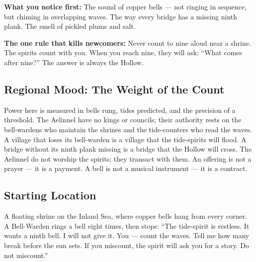 \vspace{1em}

\begin{tcolorbox}[colback=black!3,colframe=blue!60!black,title={Theme \& Atmosphere},breakable]
\textbf{What you notice first:} The sound of copper bells --- not ringing in sequence, but chiming in overlapping waves. The way every bridge has a missing ninth plank. The smell of pickled plums and salt.

\textbf{The one rule that kills newcomers:} Never count to nine aloud near a shrine. The spirits count with you. When you reach nine, they will ask: ``What comes after nine?'' The answer is always the Hollow.
\end{tcolorbox}

\subsection*{Regional Mood: The Weight of the Count}

Power here is measured in bells rung, tides predicted, and the precision of a threshold. The Aelinnel have no kings or councils; their authority rests on the bell-wardens who maintain the shrines and the tide-counters who read the waves. A village that loses its bell-warden is a village that the tide-spirits will flood. A bridge without its ninth plank missing is a bridge that the Hollow will cross. The Aelinnel do not worship the spirits; they transact with them. An offering is not a prayer --- it is a payment. A bell is not a musical instrument --- it is a contract.

\subsection*{Starting Location}

A floating shrine on the Inland Sea, where copper bells hang from every corner. A Bell-Warden rings a bell eight times, then stops: ``The tide-spirit is restless. It wants a ninth bell. I will not give it. You --- count the waves. Tell me how many break before the sun sets. If you miscount, the spirit will ask you for a story. Do not miscount.''

